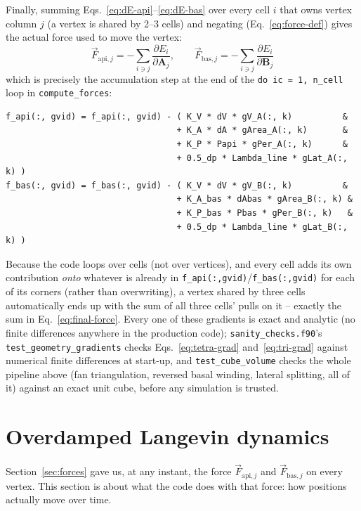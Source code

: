 \documentclass[11pt,a4paper]{report}
\newcommand{\Aarr}{\mathbf{A}}
\newcommand{\Barr}{\mathbf{B}}
\newcommand{\fapi}[1]{\vec F_{\mathrm{api},#1}}
\newcommand{\fbas}[1]{\vec F_{\mathrm{bas},#1}}
\begin{document}
Finally, summing Eqs.~\ref{eq:dE-api}--\ref{eq:dE-bas} over every cell
$i$ that owns vertex column $j$ (a vertex is shared by 2--3 cells) and
negating (Eq.~\ref{eq:force-def}) gives the actual force used to move
the vertex:
\begin{equation}
  \boxed{
  \fapi{j} = -\sum_{i \ni j}\frac{\partial E_i}{\partial \Aarr_j}, \qquad
  \fbas{j} = -\sum_{i \ni j}\frac{\partial E_i}{\partial \Barr_j}
  }
  \label{eq:final-force}
\end{equation}
which is precisely the accumulation step at the end of the \texttt{do
ic = 1, n\_cell} loop in \texttt{compute\_forces}:
\begin{lstlisting}
f_api(:, gvid) = f_api(:, gvid) - ( K_V * dV * gV_A(:, k)          &
                                  + K_A * dA * gArea_A(:, k)       &
                                  + K_P * Papi * gPer_A(:, k)      &
                                  + 0.5_dp * Lambda_line * gLat_A(:, k) )
f_bas(:, gvid) = f_bas(:, gvid) - ( K_V * dV * gV_B(:, k)          &
                                  + K_A_bas * dAbas * gArea_B(:, k) &
                                  + K_P_bas * Pbas * gPer_B(:, k)   &
                                  + 0.5_dp * Lambda_line * gLat_B(:, k) )
\end{lstlisting}
Because the code loops over cells (not over vertices), and every cell
adds its own contribution \emph{onto} whatever is already in
\texttt{f\_api(:,gvid)}/\texttt{f\_bas(:,gvid)} for each of its corners
(rather than overwriting), a vertex shared by three cells automatically
ends up with the sum of all three cells' pulls on it -- exactly the sum
in Eq.~\ref{eq:final-force}. Every one of these gradients is exact and
analytic (no finite differences anywhere in the production code);
\texttt{sanity\_checks.f90}'s \texttt{test\_geometry\_gradients} checks
Eqs.~\ref{eq:tetra-grad} and~\ref{eq:tri-grad} against numerical finite
differences at start-up, and \texttt{test\_cube\_volume} checks the
whole pipeline above (fan triangulation, reversed basal winding,
lateral splitting, all of it) against an exact unit cube, before any
simulation is trusted.

\section{Overdamped Langevin dynamics}
\label{sec:dynamics}

Section~\ref{sec:forces} gave us, at any instant, the force
$\fapi{j}$ and $\fbas{j}$ on every vertex. This section is about what
the code does with that force: how positions actually move over time.
\end{document}
